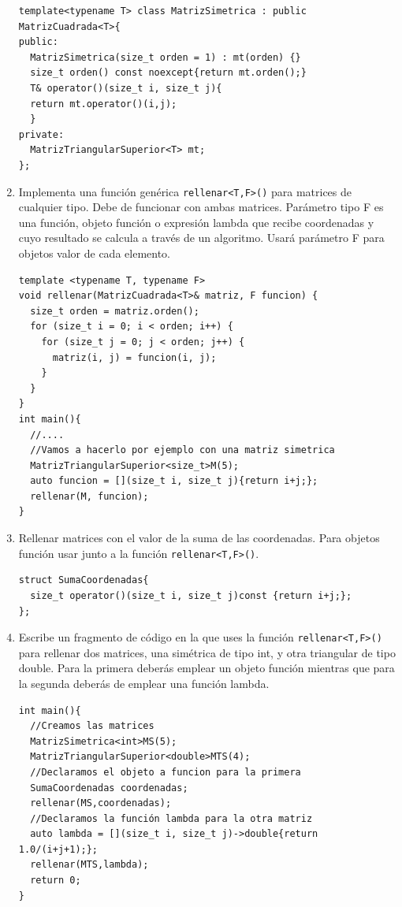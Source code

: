 \begin{enumerate}[label=\alph*)]
\begin{verbatim}
template<typename T> class MatrizSimetrica : public MatrizCuadrada<T>{
public:
  MatrizSimetrica(size_t orden = 1) : mt(orden) {}  
  size_t orden() const noexcept{return mt.orden();}
  T& operator()(size_t i, size_t j){
  return mt.operator()(i,j);
  }
private:
  MatrizTriangularSuperior<T> mt;
};

\end{verbatim}
  \item Implementa una función genérica \texttt{rellenar<T,F>()} para matrices de cualquier tipo. Debe de funcionar con ambas matrices. Parámetro tipo F es una función, objeto función o expresión lambda que recibe coordenadas y cuyo resultado se calcula a través de un algoritmo. Usará parámetro F para objetos valor de cada elemento.
\begin{verbatim}
template <typename T, typename F>
void rellenar(MatrizCuadrada<T>& matriz, F funcion) {
  size_t orden = matriz.orden();
  for (size_t i = 0; i < orden; i++) {
    for (size_t j = 0; j < orden; j++) {
      matriz(i, j) = funcion(i, j);
    }
  }
}
int main(){
  //....
  //Vamos a hacerlo por ejemplo con una matriz simetrica
  MatrizTriangularSuperior<size_t>M(5);
  auto funcion = [](size_t i, size_t j){return i+j;};
  rellenar(M, funcion);
}
\end{verbatim}
  \item Rellenar matrices con el valor de la suma de las coordenadas. Para objetos función usar junto a la función \texttt{rellenar<T,F>()}.
\begin{verbatim}
struct SumaCoordenadas{
  size_t operator()(size_t i, size_t j)const {return i+j;};
};
\end{verbatim}
  \item Escribe un fragmento de código en la que uses la función \texttt{rellenar<T,F>()} para rellenar dos matrices, una simétrica de tipo int, y otra triangular de tipo double. Para la primera deberás emplear un objeto función mientras que para la segunda deberás de emplear una función lambda.
\begin{verbatim}
int main(){
  //Creamos las matrices
  MatrizSimetrica<int>MS(5);
  MatrizTriangularSuperior<double>MTS(4);
  //Declaramos el objeto a funcion para la primera
  SumaCoordenadas coordenadas;
  rellenar(MS,coordenadas);
  //Declaramos la función lambda para la otra matriz
  auto lambda = [](size_t i, size_t j)->double{return 1.0/(i+j+1);};
  rellenar(MTS,lambda);
  return 0;
}
\end{verbatim}
\end{enumerate}
